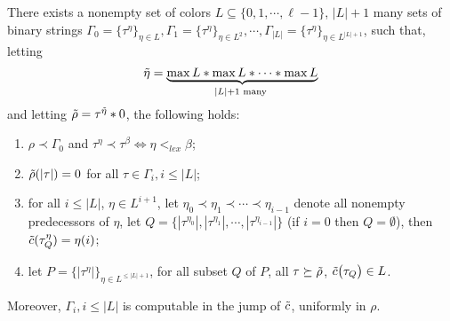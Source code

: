 \begin{lemma}\label{ovwclaim1}
There exists a nonempty set
of colors $L\subseteq \{0,1,\cdots,\ell-1\}$,
$|L|+1$ many sets of binary strings
$\Gamma_0 = \{\tau^{\eta}\}_{\eta\in L},
\Gamma_1=\{\tau^\eta\}_{\eta\in L^2},
\cdots,\Gamma_{|L|}=\{\tau^\eta\}_{\eta\in L^{|L|+1}}$,
such that, letting
$$
\tilde{\eta} =
 \underbrace{\max L *\max L *\cdots*\max L}_{|L|+1\text{ many }}
$$
 and letting $\tilde{\rho} = \tau^{\tilde{\eta}}*0$, the following holds:
\begin{enumerate}
\item $\rho\prec\Gamma_0$ and $
\tau^{\eta}\prec\tau^\beta\Leftrightarrow
\eta<_{lex}\beta$;
\item $\tilde{\rho}(|\tau|) = 0$
for all $\tau\in \Gamma_i,i\leq |L|$;

\item for all $i\leq |L|$, $\eta\in L^{i+1}$,
let $\eta_0\prec\eta_1\prec\cdots\prec\eta_{i-1}$ denote
all nonempty predecessors of $\eta$, let
$Q = \big\{|\tau^{\eta_0}|,|\tau^{\eta_1}|,
\cdots,|\tau^{\eta_{i-1}}|\big\}$
(if $i=0$ then $Q=\emptyset$),
then $\tilde{c}(\tau^{\eta}_Q) = \eta(i)$;

\item let $P = \{|\tau^\eta|\}_{\eta\in L^{\leq |L|+1}}$,
for all subset $Q$ of $P$, all $\tau\succeq\tilde{\rho}$,
$\tilde{c}\big(\tau_Q\big)
\in L$.
\end{enumerate}
Moreover,
$\Gamma_i,i\leq |L|$ is  computable in the jump of $\tilde{c}$,
 uniformly in $\rho$.


\end{lemma}
